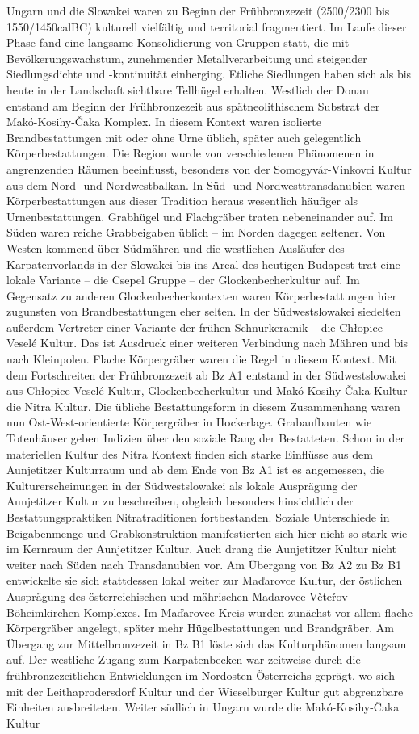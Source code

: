 \documentclass[openany,twoside,twocolumn]{book}
\begin{document}
Ungarn und die Slowakei waren zu Beginn der Frühbronzezeit (2500/2300 bis 1550/1450calBC) kulturell vielfältig und territorial fragmentiert. Im Laufe dieser Phase fand eine langsame Konsolidierung von Gruppen statt, die mit Bevölkerungswachstum, zunehmender Metallverarbeitung und steigender Siedlungsdichte und -kontinuität einherging. Etliche Siedlungen haben sich als bis heute in der Landschaft sichtbare Tellhügel erhalten. Westlich der Donau entstand am Beginn der Frühbronzezeit aus spätneolithischem Substrat der Makó-Kosihy-Čaka Komplex. In diesem Kontext waren isolierte Brandbestattungen mit oder ohne Urne üblich, später auch gelegentlich Körperbestattungen. Die Region wurde von verschiedenen Phänomenen in angrenzenden Räumen beeinflusst, besonders von der Somogyvár-Vinkovci Kultur aus dem Nord- und Nordwestbalkan. In Süd- und Nordwesttransdanubien waren Körperbestattungen aus dieser Tradition heraus wesentlich häufiger als Urnenbestattungen. Grabhügel und Flachgräber traten nebeneinander auf. Im Süden waren reiche Grabbeigaben üblich -- im Norden dagegen seltener. Von Westen kommend über Südmähren und die westlichen Ausläufer des Karpatenvorlands in der Slowakei bis ins Areal des heutigen Budapest trat eine lokale Variante -- die Csepel Gruppe -- der Glockenbecherkultur auf. Im Gegensatz zu anderen Glockenbecherkontexten waren Körperbestattungen hier zugunsten von Brandbestattungen eher selten. In der Südwestslowakei siedelten außerdem Vertreter einer Variante der frühen Schnurkeramik -- die Chłopice-Veselé Kultur. Das ist Ausdruck einer weiteren Verbindung nach Mähren und bis nach Kleinpolen. Flache Körpergräber waren die Regel in diesem Kontext. Mit dem Fortschreiten der Frühbronzezeit ab Bz A1 entstand in der Südwestslowakei aus Chłopice-Veselé Kultur, Glockenbecherkultur und Makó-Kosihy-Čaka Kultur die Nitra Kultur. Die übliche Bestattungsform in diesem Zusammenhang waren nun Ost-West-orientierte Körpergräber in Hockerlage. Grabaufbauten wie Totenhäuser geben Indizien über den soziale Rang der Bestatteten. Schon in der materiellen Kultur des Nitra Kontext finden sich starke Einflüsse aus dem Aunjetitzer Kulturraum und ab dem Ende von Bz A1 ist es angemessen, die Kulturerscheinungen in der Südwestslowakei als lokale Ausprägung der Aunjetitzer Kultur zu beschreiben, obgleich besonders hinsichtlich der Bestattungspraktiken Nitratraditionen fortbestanden. Soziale Unterschiede in Beigabenmenge und Grabkonstruktion manifestierten sich hier nicht so stark wie im Kernraum der Aunjetitzer Kultur. Auch drang die Aunjetitzer Kultur nicht weiter nach Süden nach Transdanubien vor. Am Übergang von Bz A2 zu Bz B1 entwickelte sie sich stattdessen lokal weiter zur Maďarovce Kultur, der östlichen Ausprägung des österreichischen und mährischen Maďarovce-Věteřov-Böheimkirchen Komplexes. Im Maďarovce Kreis wurden zunächst vor allem flache Körpergräber angelegt, später mehr Hügelbestattungen und Brandgräber. Am Übergang zur Mittelbronzezeit in Bz B1 löste sich das Kulturphänomen langsam auf. Der westliche Zugang zum Karpatenbecken war zeitweise durch die frühbronzezeitlichen Entwicklungen im Nordosten Österreichs geprägt, wo sich mit der Leithaprodersdorf Kultur und der Wieselburger Kultur gut abgrenzbare Einheiten ausbreiteten. Weiter südlich in Ungarn wurde die Makó-Kosihy-Čaka Kultur 
\end{document}
